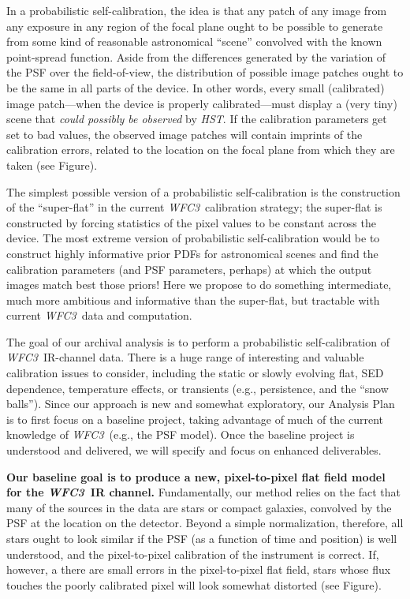 \documentclass[12pt]{article}
\newcommand{\project}[1]{\textsl{#1}}
\newcommand{\HST}{\project{HST}}
\newcommand{\WFC}{\project{WFC3}}
\begin{document}
In a probabilistic self-calibration, the idea is that any patch of any
image from any exposure in any region of the focal plane ought to be
possible to generate from some kind of reasonable astronomical
``scene'' convolved with the known point-spread function.  Aside from
the differences generated by the variation of the PSF over the
field-of-view, the distribution of possible image patches ought to be
the same in all parts of the device.  In other words, every small
(calibrated) image patch---when the device is properly
calibrated---must display a (very tiny) scene that \emph{could
  possibly be observed} by \HST.  If the calibration parameters get
set to bad values, the observed image patches will contain imprints of
the calibration errors, related to the location on the focal plane
from which they are taken (see Figure).

The simplest possible version of a probabilistic
self-calibration is the construction of the ``super-flat'' in the
current \WFC\ calibration strategy; the super-flat is constructed by
forcing statistics of the pixel values to be constant across the
device.  The most extreme version of probabilistic self-calibration
would be to construct highly informative prior PDFs for astronomical
scenes and find the calibration parameters (and PSF parameters,
perhaps) at which the output images match best those priors!  Here we
propose to do something intermediate, much more ambitious and
informative than the super-flat, but tractable with current \WFC\ data
and computation.

%
\describearchival       %

The goal of our archival analysis is to perform a probabilistic
self-calibration of \WFC\ IR-channel data.  There is a huge range of interesting
and valuable calibration issues to consider, including the static or slowly 
evolving flat, SED dependence, temperature effects, or transients
(e.g., persistence, and the ``snow balls'').  Since our approach is
new and somewhat exploratory, our Analysis Plan is to first focus on
a baseline project, taking advantage of much of the current
knowledge of \WFC\ (e.g., the PSF model).  Once the baseline project is understood
and delivered, we will specify and focus on enhanced deliverables.

\textbf{Our baseline goal is to produce a new, pixel-to-pixel
  flat field model for the \WFC\ IR channel.}
Fundamentally, our method relies on the fact
that many of the sources in the data are stars or compact galaxies, convolved by the PSF at
the location on the detector.  Beyond a simple normalization,
therefore, all stars ought to look similar if the PSF (as a
function of time and position) is well understood, and the
pixel-to-pixel calibration of the instrument is correct.  If, however,
a there are small errors in the pixel-to-pixel flat field, stars whose flux
touches the poorly calibrated pixel will look somewhat distorted (see Figure).
\end{document}
